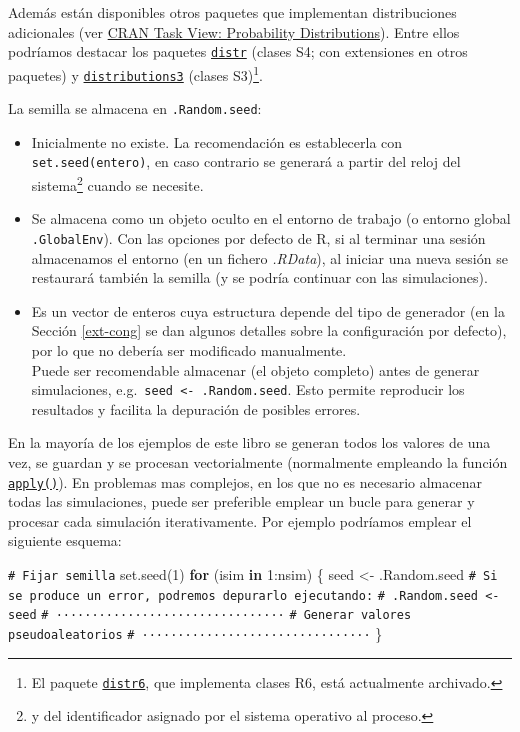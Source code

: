 \documentclass[
  10pt,
]{book}
\newenvironment{Shaded}{\begin{snugshade}}{\end{snugshade}}
\newcommand{\CommentTok}[1]{\textcolor[rgb]{0.56,0.35,0.01}{\textit{#1}}}
\newcommand{\ControlFlowTok}[1]{\textcolor[rgb]{0.13,0.29,0.53}{\textbf{#1}}}
\newcommand{\DecValTok}[1]{\textcolor[rgb]{0.00,0.00,0.81}{#1}}
\newcommand{\FunctionTok}[1]{\textcolor[rgb]{0.00,0.00,0.00}{#1}}
\newcommand{\NormalTok}[1]{#1}
\newcommand{\OtherTok}[1]{\textcolor[rgb]{0.56,0.35,0.01}{#1}}
\newcommand{\SpecialCharTok}[1]{\textcolor[rgb]{0.00,0.00,0.00}{#1}}
\theoremstyle{break}
\theoremstyle{nonumberplain}
\renewcommand{\CommentTok}[1]{\textcolor[rgb]{0.41,0.41,0.41}{\texttt{#1}}}
\let\oldfootnote\footnote
\renewcommand\footnote[1]{\oldfootnote{\hspace{2mm}#1}}
\begin{document}
Además están disponibles otros paquetes que implementan distribuciones adicionales (ver \href{https://cran.r-project.org/view=Distributions}{CRAN Task View: Probability Distributions}).
Entre ellos podríamos destacar los paquetes \href{http://distr.r-forge.r-project.org}{\texttt{distr}} (clases S4; con extensiones en otros paquetes) y \href{https://alexpghayes.github.io/distributions3/}{\texttt{distributions3}} (clases S3)\footnote{El paquete \href{https://cran.r-project.org/package=distr6}{\texttt{distr6}}, que implementa clases R6, está actualmente archivado.}.

La semilla se almacena en \texttt{.Random.seed}:

\begin{itemize}
\item
  Inicialmente no existe.
  La recomendación es establecerla con \texttt{set.seed(entero)}, en caso contrario se generará a partir del reloj del sistema\footnote{y del identificador asignado por el sistema operativo al proceso.} cuando se necesite.
\item
  Se almacena como un objeto oculto en el entorno de trabajo (o entorno global \texttt{.GlobalEnv}). Con las opciones por defecto de R, si al terminar una sesión almacenamos el entorno (en un fichero \emph{.RData}), al iniciar una nueva sesión se restaurará también la semilla (y se podría continuar con las simulaciones).
\item
  Es un vector de enteros cuya estructura depende del tipo de generador (en la Sección \ref{ext-cong} se dan algunos detalles sobre la configuración por defecto), por lo que no debería ser modificado manualmente.\\
  Puede ser recomendable almacenar (el objeto completo) antes de generar simulaciones, e.g.~\texttt{seed\ \textless{}-\ .Random.seed}. Esto permite reproducir los resultados y facilita la depuración de posibles errores.
\end{itemize}

En la mayoría de los ejemplos de este libro se generan todos los valores de una vez,
se guardan y se procesan vectorialmente (normalmente empleando la función \href{https://rdrr.io/r/base/apply.html}{\texttt{apply()}}).
En problemas mas complejos, en los que no es necesario almacenar todas las simulaciones,
puede ser preferible emplear un bucle para generar y procesar cada simulación iterativamente.
Por ejemplo podríamos emplear el siguiente esquema:

\begin{Shaded}
\begin{Highlighting}[]
\CommentTok{\# Fijar semilla}
\FunctionTok{set.seed}\NormalTok{(}\DecValTok{1}\NormalTok{)}
\ControlFlowTok{for}\NormalTok{ (isim }\ControlFlowTok{in} \DecValTok{1}\SpecialCharTok{:}\NormalTok{nsim) \{}
\NormalTok{  seed }\OtherTok{\textless{}{-}}\NormalTok{ .Random.seed}
  \CommentTok{\# Si se produce un error, podremos depurarlo ejecutando:}
  \CommentTok{\#  .Random.seed \textless{}{-} seed}
  \CommentTok{\# ································}
  \CommentTok{\# Generar valores pseudoaleatorios}
  \CommentTok{\# ································}
\NormalTok{\}}
\end{Highlighting}
\end{Shaded}
\end{document}
